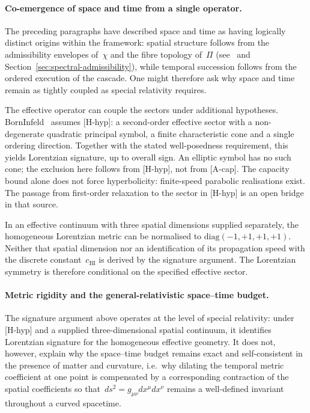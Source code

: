   \paragraph{Co-emergence of space and time from a single operator.}
    The preceding paragraphs have described space and time as having logically distinct
    origins within the framework: spatial structure follows from the admissibility
    envelopes of~$\chi$ and the fibre topology of~$\Pi$
    (see~\cite{Beau2026a1} and Section~\ref{sec:spectral-admissibility}),
    while temporal succession follows from the ordered execution of the cascade.
    One might therefore ask why space and time remain as tightly coupled as special relativity requires.

    The effective operator can couple the sectors under additional hypotheses.
    BornInfeld~\cite{Beau2026c} assumes [H-hyp]: a second-order effective sector with a non-degenerate
    quadratic principal symbol, a finite characteristic cone and a single ordering direction.
    Together with the stated well-posedness requirement, this yields Lorentzian signature, up to overall sign.
    An elliptic symbol has no such cone; the exclusion here follows from [H-hyp], not from [A-cap].
    The capacity bound alone does not force hyperbolicity: finite-speed parabolic realisations exist.
    The passage from first-order relaxation to the sector in [H-hyp] is an open bridge in that source.

    In an effective continuum with three spatial dimensions supplied separately, the homogeneous
    Lorentzian metric can be normalised to $\mathrm{diag}(-1,+1,+1,+1)$.
    Neither that spatial dimension nor an identification of its propagation speed with the discrete
    constant~$c_{\mathrm{BI}}$ is derived by the signature argument.
    The Lorentzian symmetry is therefore conditional on the specified effective sector.

  \paragraph{Metric rigidity and the general-relativistic space--time budget.}
    The signature argument above operates at the level of special relativity:
    under [H-hyp] and a supplied three-dimensional spatial continuum, it identifies Lorentzian signature
    for the homogeneous effective geometry.
    It does not, however, explain why the space--time budget remains exact and
    self-consistent in the presence of matter and curvature, i.e.\ why dilating the
    temporal metric coefficient at one point is compensated by a corresponding
    contraction of the spatial coefficients so that~$ds^2 = g_{\mu\nu}dx^\mu dx^\nu$
    remains a well-defined invariant throughout a curved spacetime.

